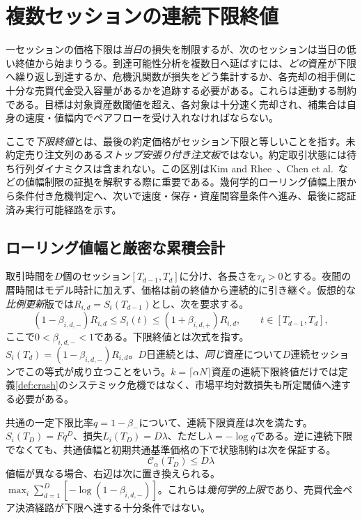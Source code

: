 \documentclass[11pt]{article}
\numberwithin{equation}{section}
\theoremstyle{definition}
\theoremstyle{remark}
\newcommand{\Cris}{\mathcal{C}}
\begin{document}
\section{複数セッションの連続下限終値}\label{sec:multiday}
一セッションの価格下限は\emph{当日}の損失を制限するが、次のセッションは当日の低い終値から始まりうる。到達可能性分析を複数日へ延ばすには、\emph{どの}資産が下限へ繰り返し到達するか、危機汎関数が損失をどう集計するか、各売却の相手側に十分な売買代金受入容量があるかを追跡する必要がある。これらは連動する制約である。目標は対象資産数閾値を超え、各対象は十分速く売却され、補集合は自身の速度・値幅内でペアフローを受け入れなければならない。

ここで\emph{下限終値}とは、最後の約定価格がセッション下限と等しいことを指す。未約定売り注文列のある\emph{ストップ安張り付き注文板}ではない。約定取引状態には待ち行列ダイナミクスは含まれない。この区別はKim and Rhee~\citep{KimRhee1997}、Chen et al.~\citep{Chen2019}などの値幅制限の証拠を解釈する際に重要である。幾何学的ローリング値幅上限から条件付き危機判定へ、次いで速度・保存・資産間容量条件へ進み、最後に認証済み実行可能経路を示す。

\subsection{ローリング値幅と厳密な累積会計}\label{subsec:multiday-protocol}
取引時間を$D$個のセッション$[T_{d-1},T_d]$に分け、各長さを$\tau_d>0$とする。夜間の暦時間はモデル時計に加えず、価格は前の終値から連続的に引き継ぐ。仮想的な\emph{比例更新}版では$R_{i,d}=S_i(T_{d-1})$とし、次を要求する。
\begin{equation}\label{eq:rolling-band}
 (1-\beta_{i,d,-})R_{i,d}\le S_i(t)\le(1+\beta_{i,d,+})R_{i,d},
 \qquad t\in[T_{d-1},T_d],
\end{equation}
ここで$0<\beta_{i,d,-}<1$である。下限終値とは次式を指す。
$S_i(T_d)=(1-\beta_{i,d,-})R_{i,d}$。$D$日連続とは、\emph{同じ}資産について$D$連続セッションでこの等式が成り立つことをいう。$k=\lceil\alpha N\rceil$資産の連続下限終値だけでは定義\ref{def:crash}のシステミック危機ではなく、市場平均対数損失も所定閾値へ達する必要がある。

共通の一定下限比率$q=1-\beta_-$について、連続下限資産は次を満たす。
$S_i(T_D)=Fq^D$、損失$L_i(T_D)=D\lambda$、ただし$\lambda=-\log q$である。逆に連続下限でなくても、共通値幅と初期共通基準価格の下で状態制約は次を保証する。
\begin{equation}\label{eq:rolling-cumulative-upper}
  \Cris_\alpha(T_D)\le D\lambda
\end{equation}
値幅が異なる場合、右辺は次に置き換えられる。
$\max_i\sum_{d=1}^D[-\log(1-\beta_{i,d,-})]$。これらは\emph{幾何学的上限}であり、売買代金ペア決済経路が下限へ達する十分条件ではない。
\end{document}
